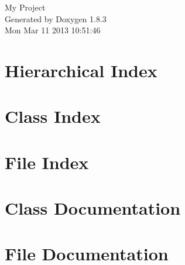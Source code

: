 \documentclass{book}
\begin{document}
\hypersetup{pageanchor=false,citecolor=blue}
\begin{titlepage}
\vspace*{7cm}
\begin{center}
{\Large My Project }\\
\vspace*{1cm}
{\large Generated by Doxygen 1.8.3}\\
\vspace*{0.5cm}
{\small Mon Mar 11 2013 10:51:46}\\
\end{center}
\end{titlepage}
\clearemptydoublepage
{}
\tableofcontents
\clearemptydoublepage
{}
\hypersetup{pageanchor=true,citecolor=blue}
\chapter{Hierarchical Index}

\chapter{Class Index}

\chapter{File Index}

\chapter{Class Documentation}

































\chapter{File Documentation}
















\printindex
\end{document}
